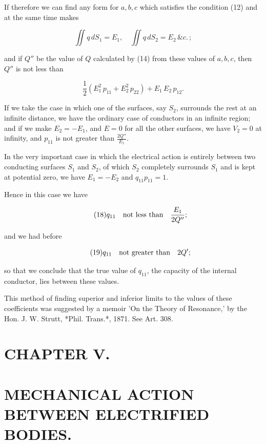 \documentclass[11pt,a4paper]{article}
\begin{document}
If therefore we can find any form for $a,b,c$ which satisfies the condition (12) and at the same time makes

\begin{equation}\tag{16}
\iint q \, dS_1 = E_1, \quad \iint q \, dS_2 = E_2 \, \&c. \,;
\end{equation}

and if $Q''$ be the value of $Q$ calculated by (14) from these values of $a,b,c$, then $Q''$ is not less than

\begin{equation}\tag{17}
\frac{1}{2} \left( E_1^2 \, p_{11} + E_2^2 \, p_{22} \right) + E_1 \, E_2 \, p_{12}.
\end{equation}

If we take the case in which one of the surfaces, say $S_2$, surrounds the rest at an infinite distance, we have the ordinary case of conductors in an infinite region; and if we make $E_2=-E_1$, and $E=0$ for all the other surfaces, we have $V_2=0$ at infinity, and $p_{11}$ is not greater than $\frac{2Q''}{E_1}$.

In the very important case in which the electrical action is entirely between two conducting surfaces $S_1$ and $S_2$, of which $S_2$ completely surrounds $S_1$ and is kept at potential zero, we have $E_1=-E_2$ and $q_{11}p_{11}=1$.

Hence in this case we have

\begin{equation}\tag{18}
q_{11}\quad\hbox{not less than}\quad \frac{E_1}{2Q''};
\end{equation}

and we had before

\begin{equation}\tag{19}
q_{11}\quad\hbox{not greater than}\quad 2Q';
\end{equation}

so that we conclude that the true value of $q_{11}$, the capacity of the internal conductor, lies between these values.

This method of finding superior and inferior limits to the values of these coefficients was suggested by a memoir 'On the Theory of Resonance,' by the Hon. J. W. Strutt, *Phil. Trans.*, 1871. See Art. 308.

\section*{CHAPTER V.}

\section*{MECHANICAL ACTION BETWEEN ELECTRIFIED BODIES.}
\end{document}
